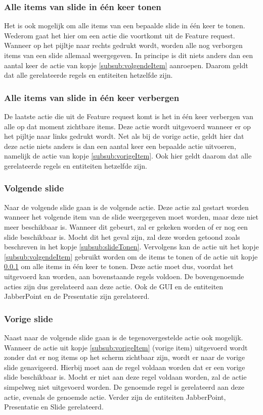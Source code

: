 \documentclass[a4paper]{article}
\newcommand{\1}[0]{\'{e}\'{e}n}
\begin{document}
\subsubsection{Alle items van slide in \1 keer tonen}
\label{subsub:alleItems}
Het is ook mogelijk om alle items van een bepaalde slide in \1 keer te tonen. Wederom gaat het hier om een actie die voortkomt uit de Feature request. Wanneer op het pijltje naar rechts gedrukt wordt, worden alle nog verborgen items van een slide allemaal weergegeven. In principe is dit niets anders dan een aantal keer de actie van kopje \ref{subsub:volgendeItem} aanroepen. Daarom geldt dat alle gerelateerde regels en entiteiten hetzelfde zijn.

\subsubsection{Alle items van slide in \1 keer verbergen}
De laatste actie die uit de Feature request komt is het in \1 keer verbergen van alle op dat moment zichtbare items. Deze actie wordt uitgevoerd wanneer er op het pijltje naar links gedrukt wordt. Net als bij de vorige actie, geldt hier dat deze actie niets anders is dan een aantal keer een bepaalde actie uitvoeren, namelijk de actie van kopje \ref{subsub:vorigeItem}. Ook hier geldt daarom dat alle gerelateerde regels en entiteiten hetzelfde zijn.

\subsubsection{Volgende slide}
\label{subsub:volgendeSlide}
Naar de volgende slide gaan is de volgende actie. Deze actie zal gestart worden wanneer het volgende item van de slide weergegeven moet worden, maar deze niet meer beschikbaar is. Wanneer dit gebeurt, zal er gekeken worden of er nog een slide beschikbaar is. Mocht dit het geval zijn, zal deze worden getoond zoals beschreven in het kopje \ref{subsub:slideTonen}. Vervolgens kan de actie uit het kopje \ref{subsub:volgendeItem} gebruikt worden om de items te tonen of de actie uit kopje \ref{subsub:alleItems} om alle items in \1 keer te tonen. Deze actie moet dus, voordat het uitgevoerd kan worden, aan bovenstaande regels voldoen. De bovengenoemde acties zijn dus gerelateerd aan deze actie. Ook de GUI en de entiteiten JabberPoint en de Presentatie zijn gerelateerd.

\subsubsection{Vorige slide}
\label{subsub:vorigeSlide}
Naast naar de volgende slide gaan is de tegenovergestelde actie ook mogelijk. Wanneer de actie uit kopje \ref{subsub:vorigeItem} (vorige item) uitgevoerd wordt zonder dat er nog items op het scherm zichtbaar zijn, wordt er naar de vorige slide genavigeerd. Hierbij moet aan de regel voldaan worden dat er een vorige slide beschikbaar is. Mocht er niet aan deze regel voldaan worden, zal de actie simpelweg niet uitgevoerd worden. De genoemde regel is gerelateerd aan deze actie, evenals de genoemde actie. Verder zijn de entiteiten JabberPoint, Presentatie en Slide gerelateerd.
\end{document}
